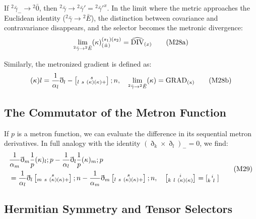\documentclass[11pt,a4paper,oneside]{article}
\newcommand{\ethop}{\eth}
\newcommand{\metroncap}[4][]{%
    \left[ \renewcommand{\arraystretch}{0.85} \substack{#2 \\ #3 \ #4} \right]_{#1}%
}
\begin{document}
If ${}^2\bar{\gamma}_- \to {}^2\bar{0}$, then ${}^2\bar{\gamma} \to {}^2\bar{\gamma}' = {}^2\bar{\gamma}'^x$. In the limit where the metric approaches the Euclidean identity (${}^2\bar{\gamma} \to {}^2\bar{E}$), the distinction between covariance and contravariance disappears, and the selector becomes the metronic divergence:
\begin{equation}
    \lim_{{}^2\bar{\gamma} \to {}^2\bar{E}} (\kappa)^{(s_1)(s_2)}_{(\pm)} = \widehat{\rm{DIV}}_{(x)} \tag{M28a}
\end{equation}

Similarly, the metronized gradient is defined as:
\begin{equation}
    (\kappa)l = \frac{1}{\alpha_l} \ethop_l - \metroncap{s}{l\ s}{(\kappa)(\kappa)+}; n, \quad \lim_{{}^2\bar{\gamma} \to {}^2\bar{E}} (\kappa) = \rm{GRAD}_{(x)} \tag{M28b}
\end{equation}

\subsection{The Commutator of the Metron Function}

If $p$ is a metron function, we can evaluate the difference in its sequential metron derivatives. In full analogy with the identity $(\ethop_k \times \ethop_l)_- = 0$, we find:
\begin{equation}
    \begin{split}
        &\frac{1}{\alpha_m} \ethop_m \frac{1}{p}(\kappa)_l; p - \frac{1}{\alpha_l} \ethop_l \frac{1}{p}(\kappa)_m; p \\
        &= \frac{1}{\alpha_l} \ethop_l \metroncap{s}{m\ s}{(\kappa)(\kappa)+}; n - \frac{1}{\alpha_m} \ethop_m \metroncap{s}{l\ s}{(\kappa)(\kappa)+}; n, \quad \metroncap{i}{k\ l}{(\kappa)(\kappa)} = \metroncap{i}{k\ l}{ }
    \end{split} \tag{M29}
\end{equation}

\subsection{Hermitian Symmetry and Tensor Selectors}
\end{document}
